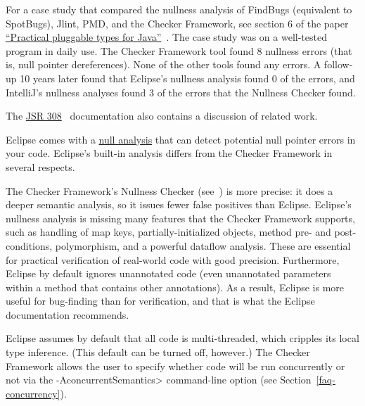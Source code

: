 For a case study that compared the nullness analysis of FindBugs
(equivalent to SpotBugs), Jlint,
PMD, and the Checker Framework, see section 6 of the paper
\href{https://homes.cs.washington.edu/~mernst/pubs/pluggable-checkers-issta2008.pdf}{``Practical pluggable types for Java''}~\cite{PapiACPE2008}.
The case study was on a well-tested program in daily use.  The Checker
Framework tool found 8 nullness errors (that is, null pointer
dereferences).  None of the other tools found any errors.  A follow-up 10
years later found that Eclipse's nullness analysis found 0 of the errors,
and IntelliJ's nullness analyses found 3 of the errors that the Nullness
Checker found.

The
\href{https://checkerframework.org/jsr308/}{JSR 308}~\cite{JSR308-2008-09-12}
documentation also contains a discussion of related work.



Eclipse comes with a
\href{https://help.eclipse.org/luna/index.jsp?topic=\%2Forg.eclipse.jdt.doc.user\%2Ftasks\%2Ftask-using_null_annotations.htm}{null analysis} that
can detect potential null pointer errors in your code.  Eclipse's built-in
analysis differs from the Checker Framework in several respects.

The Checker Framework's Nullness Checker
(see~) is more precise:  it does a deeper
semantic analysis, so it issues fewer false positives than Eclipse.
Eclipse's nullness analysis is missing many features that the Checker
Framework supports, such as handling of map keys, partially-initialized
objects, method pre- and post-conditions, polymorphism, and a powerful
dataflow analysis.  These are essential for practical verification of
real-world code with good precision.
Furthermore, Eclipse by default ignores unannotated code (even unannotated
parameters within a method that contains other annotations).
As a result, Eclipse is more useful for bug-finding than for verification,
and that is what the Eclipse documentation recommends.

Eclipse assumes by default that all code is multi-threaded, which cripples its local
type inference.  (This default can be turned off, however.)
The Checker Framework allows the user to
specify whether code will be run concurrently or not via the
\<-AconcurrentSemantics> command-line option (see
Section~\ref{faq-concurrency}).

